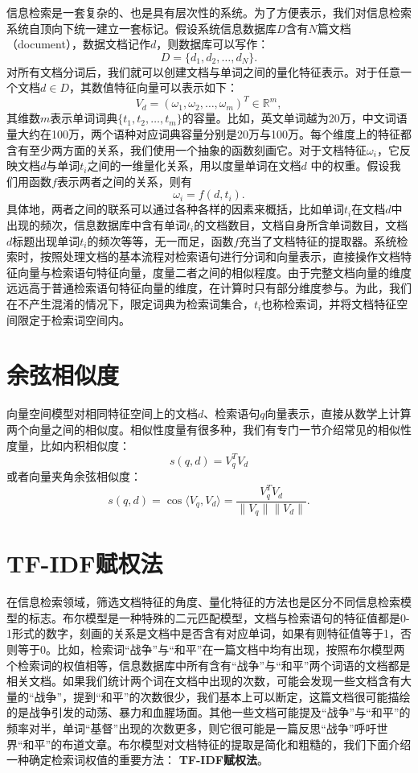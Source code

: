 信息检索是一套复杂的、也是具有层次性的系统。为了方便表示，我们对信息检索系统自顶向下统一建立一套标记。假设系统信息数据库$D$含有$N$篇文档（document），数据文档记作$d$，则数据库可以写作：
\[
    D = \{d_1, d_2, \ldots, d_N\}.
\]
对所有文档分词后，我们就可以创建文档与单词之间的量化特征表示。对于任意一个文档$d\in D$，其数值特征向量可以表示如下：
\[
    V_d = (\omega_1, \omega_2, \ldots, \omega_m)^T\in \mathbb R^m,
\]
其维数$m$表示单词词典$\{t_1, t_2, \ldots, t_m\}$的容量。比如，英文单词越为20万，中文词语量大约在100万，两个语种对应词典容量分别是20万与100万。每个维度上的特征都含有至少两方面的关系，我们使用一个抽象的函数刻画它。对于文档特征$\omega_i$，它反映文档$d$与单词$t_i$之间的一维量化关系，用以度量单词在文档$d$ 中的权重。假设我们用函数$f$表示两者之间的关系，则有
\[
    \omega_i = f(d, t_i).
\]
具体地，两者之间的联系可以通过各种各样的因素来概括，比如单词$t_i$在文档$d$中出现的频次，信息数据库中含有单词$t_i$的文档数目，文档自身所含单词数目，文档$d$标题出现单词$t_i$的频次等等，无一而足，函数$f$充当了文档特征的提取器。系统检索时，按照处理文档的基本流程对检索语句进行分词和向量表示，直接操作文档特征向量与检索语句特征向量，度量二者之间的相似程度。由于完整文档向量的维度远远高于普通检索语句特征向量的维度，在计算时只有部分维度参与。为此，我们在不产生混淆的情况下，限定词典为检索词集合，$t_i$也称检索词，并将文档特征空间限定于检索词空间内。

\section{余弦相似度}
向量空间模型对相同特征空间上的文档$d$、检索语句$q$向量表示，直接从数学上计算两个向量之间的相似度。相似性度量有很多种，我们有专门一节介绍常见的相似性度量，比如内积相似度：\[s(q,d) = V_q^T V_d\]或者向量夹角余弦相似度：
\[
    s(q,d) = \cos \langle V_q, V_d\rangle = \frac{V_q^T V_d}{\|V_q\|\|V_d\|}.
\]

\section{TF-IDF赋权法}
在信息检索领域，筛选文档特征的角度、量化特征的方法也是区分不同信息检索模型的标志。布尔模型是一种特殊的二元匹配模型，文档与检索语句的特征值都是0-1形式的数字，刻画的关系是文档中是否含有对应单词，如果有则特征值等于1，否则等于0。比如，检索词“战争”与“和平”在一篇文档中均有出现，按照布尔模型两个检索词的权值相等，信息数据库中所有含有“战争”与“和平”两个词语的文档都是相关文档。如果我们统计两个词在文档中出现的次数，可能会发现一些文档含有大量的“战争”，提到“和平”的次数很少，我们基本上可以断定，这篇文档很可能描绘的是战争引发的动荡、暴力和血腥场面。其他一些文档可能提及“战争”与“和平”的频率对半，单词“基督”出现的次数更多，则它很可能是一篇反思“战争”呼吁世界“和平”的布道文章。布尔模型对文档特征的提取是简化和粗糙的，我们下面介绍一种确定检索词权值的重要方法：
\textbf{TF-IDF赋权法}。

